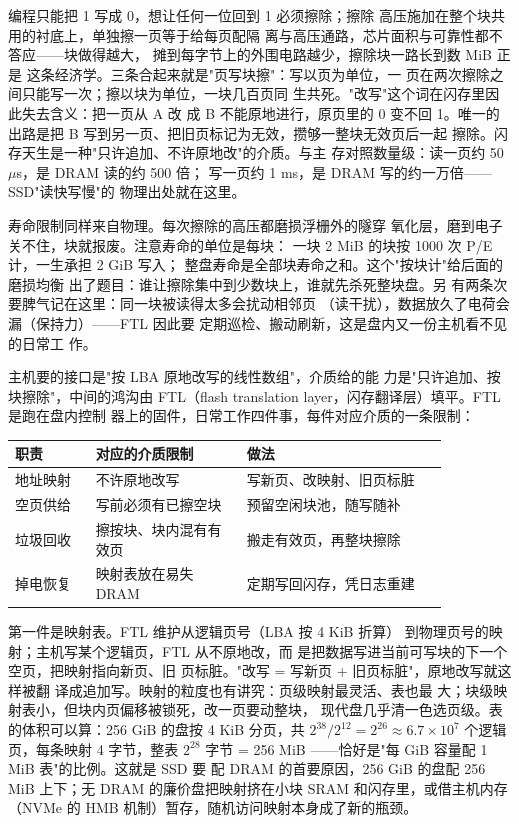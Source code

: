 编程只能把 1 写成 0，想让任何一位回到 1 必须擦除；擦除
高压施加在整个块共用的衬底上，单独擦一页等于给每页配隔
离与高压通路，芯片面积与可靠性都不答应——块做得越大，
摊到每字节上的外围电路越少，擦除块一路长到数 MiB 正是
这条经济学。三条合起来就是"页写块擦"：写以页为单位，一
页在两次擦除之间只能写一次；擦以块为单位，一块几百页同
生共死。"改写"这个词在闪存里因此失去含义：把一页从 A 改
成 B 不能原地进行，原页里的 0 变不回 1。唯一的出路是把
B 写到另一页、把旧页标记为无效，攒够一整块无效页后一起
擦除。闪存天生是一种"只许追加、不许原地改"的介质。与主
存对照数量级：读一页约 50 $\mu$s，是 DRAM 读的约 500 倍；
写一页约 1 ms，是 DRAM 写的约一万倍——SSD"读快写慢"的
物理出处就在这里。

寿命限制同样来自物理。每次擦除的高压都磨损浮栅外的隧穿
氧化层，磨到电子关不住，块就报废。注意寿命的单位是每块：
一块 2 MiB 的块按 1000 次 P/E 计，一生承担 2 GiB 写入；
整盘寿命是全部块寿命之和。这个"按块计"给后面的磨损均衡
出了题目：谁让擦除集中到少数块上，谁就先杀死整块盘。另
有两条次要脾气记在这里：同一块被读得太多会扰动相邻页
（读干扰），数据放久了电荷会漏（保持力）——FTL 因此要
定期巡检、搬动刷新，这是盘内又一份主机看不见的日常工
作。

主机要的接口是"按 LBA 原地改写的线性数组"，介质给的能
力是"只许追加、按块擦除"，中间的鸿沟由 FTL（flash
translation layer，闪存翻译层）填平。FTL 是跑在盘内控制
器上的固件，日常工作四件事，每件对应介质的一条限制：

\begin{longtable}{L{0.16\linewidth}L{0.3\linewidth}L{0.4\linewidth}}
\toprule
职责 & 对应的介质限制 & 做法 \\
\midrule
地址映射 & 不许原地改写 & 写新页、改映射、旧页标脏 \\
空页供给 & 写前必须有已擦空块 & 预留空闲块池，随写随补 \\
垃圾回收 & 擦按块、块内混有有效页 & 搬走有效页，再整块擦除 \\
掉电恢复 & 映射表放在易失 DRAM & 定期写回闪存，凭日志重建 \\
\bottomrule
\end{longtable}

第一件是映射表。FTL 维护从逻辑页号（LBA 按 4 KiB 折算）
到物理页号的映射；主机写某个逻辑页，FTL 从不原地改，而
是把数据写进当前可写块的下一个空页，把映射指向新页、旧
页标脏。"改写 = 写新页 + 旧页标脏"，原地改写就这样被翻
译成追加写。映射的粒度也有讲究：页级映射最灵活、表也最
大；块级映射表小，但块内页偏移被锁死，改一页要动整块，
现代盘几乎清一色选页级。表的体积可以算：256 GiB 的盘按
4 KiB 分页，共 $2^{38}/2^{12}=2^{26}\approx6.7\times10^{7}$
个逻辑页，每条映射 4 字节，整表 $2^{28}$ 字节 = 256 MiB
——恰好是"每 GiB 容量配 1 MiB 表"的比例。这就是 SSD 要
配 DRAM 的首要原因，256 GiB 的盘配 256 MiB 上下；无 DRAM
的廉价盘把映射挤在小块 SRAM 和闪存里，或借主机内存
（NVMe 的 HMB 机制）暂存，随机访问映射本身成了新的瓶颈。

